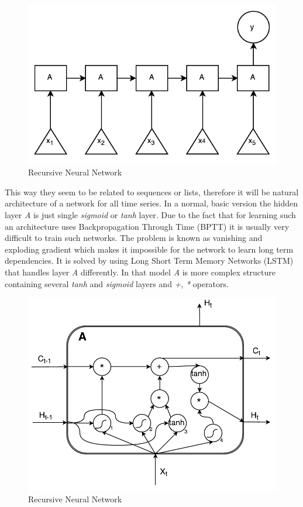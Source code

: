 \documentclass[twoside]{article}
\begin{document}
\begin{multicols}{2}
\begin{figure}[H]
\centering
\includegraphics[scale=0.75]{RNN}
\caption{Recursive Neural Network}
\label{ref:rnn}
\end{figure} 

This way they seem to be related to sequences or lists, therefore it will be natural architecture of a network for all time series.
In a normal, basic version the hidden layer \emph{A} is just single \emph{sigmoid} or \emph{tanh} layer.  Due to the fact that for
learning such an architecture uses Backpropagation Through Time (BPTT) it is usually very difficult to train such networks. The problem
is known as vanishing and exploding gradient which makes it impossible for the network to learn long term dependencies. It is solved
by using Long Short Term Memory Networks (LSTM) that handles layer \emph{A} differently. In that model \emph{A} is more complex
structure containing several \emph{tanh} and \emph{sigmoid} layers and \emph{+}, \emph{*} operators.

\begin{figure}[H]
\centering
\includegraphics[scale=0.5]{LSTM}
\caption{Recursive Neural Network}
\label{ref:rnn}
\end{figure} 


\end{multicols}
\end{document}
